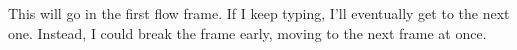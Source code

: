 \documentclass[a4paper]{article}
\begin{document}
This will go in the first flow frame.
If I keep typing, I'll eventually get to the next one.
Instead, I could\newpage
break the frame early, moving to the next frame at once.
\end{document}

